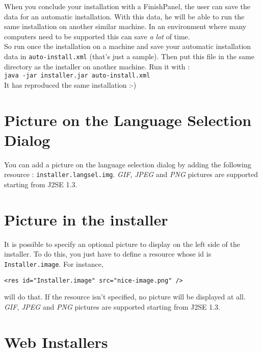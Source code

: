 When you conclude your installation with a FinishPanel, the user can
save the data for an automatic installation. With this data, he will be
able to run the same installation on another similar machine. In an
environment where many computers need to be supported this can save
\textsl{a lot} of time.\\

So run once the installation on a machine and save your automatic installation
data in \texttt{auto-install.xml} (that's just a sample). Then put this file in
the same directory as the installer on another machine. Run it with :\\
\texttt{java -jar installer.jar auto-install.xml}\\

It has reproduced the same installation :-)\\

\section{Picture on the Language Selection Dialog}

You can add a picture on the language selection dialog by adding the following
resource : \texttt{installer.langsel.img}. \textsl{GIF}, \textsl{JPEG} and
\textsl{PNG} pictures are supported starting from J2SE 1.3.\\

\section{Picture in the installer}

It is possible to specify an optional picture to display on the left side of the
installer. To do this, you just have to define a resource whose id is
\texttt{Installer.image}. For instance,
\begin{verbatim}
<res id="Installer.image" src="nice-image.png" />
\end{verbatim}
will do that. If the resource isn't specified, no picture will be displayed at
all. \textsl{GIF}, \textsl{JPEG} and
\textsl{PNG} pictures are supported starting from J2SE 1.3.\\


\section{Web Installers}


